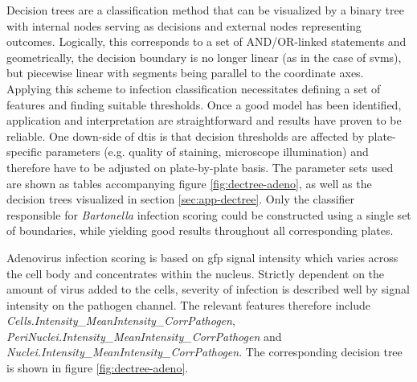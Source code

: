 Decision trees are a classification method that can be visualized by a binary tree with internal nodes serving as decisions and external nodes representing outcomes. Logically, this corresponds to a set of AND\slash OR-linked statements and geometrically, the decision boundary is no longer linear (as in the case of \glspl{svm}), but piecewise linear with segments being parallel to the coordinate axes. Applying this scheme to infection classification necessitates defining a set of features and finding suitable thresholds. Once a good model has been identified, application and interpretation are straightforward and results have proven to be reliable. One down-side of \gls{dtis} is that decision thresholds are affected by plate-specific parameters (e.g. quality of staining, microscope illumination) and therefore have to be adjusted on plate-by-plate basis. The parameter sets used are shown as tables accompanying figure \ref{fig:dectree-adeno}, as well as the decision trees visualized in section \ref{sec:app-dectree}. Only the classifier responsible for \textit{Bartonella} infection scoring could be constructed using a single set of boundaries, while yielding good results throughout all corresponding plates. 

Adenovirus infection scoring is based on \gls{gfp} signal intensity which varies across the cell body and concentrates within the nucleus. Strictly dependent on the amount of virus added to the cells, severity of infection is described well by signal intensity on the pathogen channel. The relevant features therefore include \textit{Cells.Intensity\_MeanIntensity\_CorrPathogen}, \textit{PeriNuclei.Intensity\_MeanIn\-tensity\_CorrPathogen} and \textit{Nuclei.Intensity\_MeanIntensity\_CorrPathogen}. The corresponding decision tree is shown in figure \ref{fig:dectree-adeno}.


